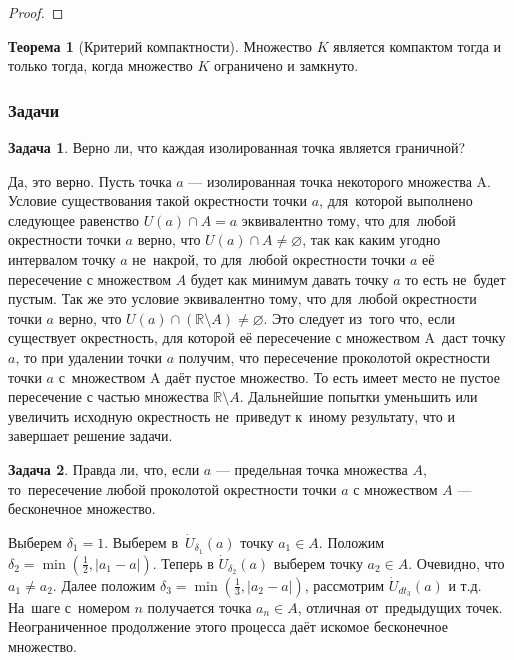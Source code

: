 \documentclass[pdftex, 12pt, a4paper]{article}
\def \mbb{\mathbb}
\def \RR{\mbb R}
\def \dt{\delta}
\theoremstyle{definition} %
\newtheorem{myth}{Теорема}
\newtheorem{problem}{Задача}
\numberwithin{problem}{section}
\numberwithin{blits}{section}
\begin{document}
\begin{proof}
\end{proof}


\begin{myth}[Критерий компактности] Множество $K$ является компактом тогда и только тогда, когда множество $K$ ограничено и замкнуто.  
\end{myth}

\subsubsection*{Задачи}

\begin{problem}
Верно ли, что каждая изолированная точка является граничной?
\begin{sol}
Да, это верно. Пусть точка $a$ --- изолированная точка некоторого множества A. Условие существования такой окрестности точки $a$, для~которой выполнено следующее равенство $U(a) \cap A = a$ эквивалентно тому, что для~любой окрестности точки $a$ верно, что $U(a) \cap A \ne \varnothing $, так как каким угодно интервалом точку $a$ не~накрой, то для~любой окрестности точки $a$ её пересечение с множеством $A$ будет как минимум давать точку $a$ то есть не~будет пустым. Так же это условие эквивалентно тому, что для~любой окрестности точки $a$ верно, что $U(a) \cap (\RR \setminus A)\ne \varnothing$. Это следует из~того что, если существует окрестность, для которой её пересечение с множеством A~даст точку $a$, то при удалении точки $a$ получим, что пересечение проколотой окрестности точки $a$ с~множеством A даёт пустое множество. То есть имеет место не пустое пересечение с частью множества $\RR \setminus A$. Дальнейшие попытки уменьшить или увеличить исходную окрестность не~приведут к~иному результату, что и завершает решение задачи.
\end{sol}
\end{problem}

\begin{problem}
Правда ли, что, если $a$ --- предельная точка множества $A$, то~пересечение любой проколотой окрестности точки $a$ с множеством $A$ --- бесконечное множество.
\begin{sol}
Выберем $\dt_1=1$. Выберем в~$\dot U_{\dt_1} (a)$ точку $a_1 \in A$. Положим $\dt_2 = \min (\frac{1}{2}, |a_1 - a|)$. Теперь в $\dot U_{\dt_2} (a)$ выберем точку $a_2 \in A$. Очевидно, что $a_1 \ne a_2$. Далее положим $\dt_3 = \min (\frac{1}{3}, |a_2 - a|)$, рассмотрим $\dot U_{dt_3} (a)$ и т.д. На~шаге с~номером $n$ получается точка $a_n \in A$, отличная от~предыдущих точек. Неограниченное продолжение этого процесса даёт искомое бесконечное множество.
\end{sol}
\end{problem}
\end{document}
